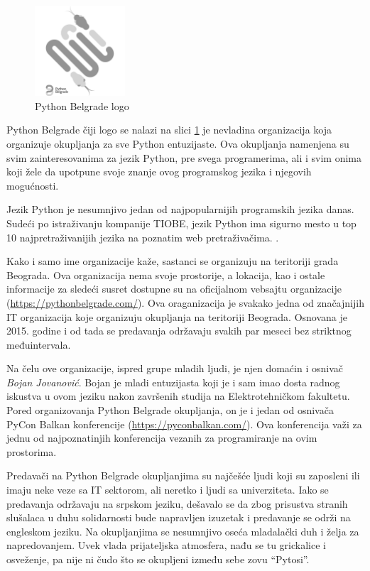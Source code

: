 \documentclass[a4paper]{article}
\begin{document}
{\begin{figure}[h!]
  \centering
  \includegraphics[width=0.3\textwidth]{pybgd.png}
  \caption{Python Belgrade logo}
  \label{fig:Pythonlogo}
\end{figure}

Python Belgrade čiji logo se nalazi na slici \ref{fig:Pythonlogo} je nevladina organizacija koja organizuje okupljanja za sve Python entuzijaste. Ova okupljanja namenjena su svim
zainteresovanima za jezik Python, pre svega programerima, ali i svim onima koji žele da upotpune svoje znanje ovog programskog jezika i njegovih mogućnosti.

Jezik Python je nesumnjivo jedan od najpopularnijih programskih jezika danas. Sudeći po istraživanju kompanije TIOBE, jezik Python ima sigurno mesto u top 10 najpretraživanijih jezika na poznatim web pretraživačima. \cite{pythonPopular}.

Kako i samo ime organizacije kaže, sastanci se organizuju na teritoriji grada Beograda. Ova organizacija nema svoje prostorije, a lokacija, kao i ostale informacije
za sledeći susret dostupne su na oficijalnom vebsajtu organizacije (\url{https://pythonbelgrade.com/}). Ova oraganizacija je svakako jedna od značajnijih IT organizacija koje organizuju okupljanja na teritoriji Beograda. Osnovana je 2015. godine i od tada se predavanja održavaju svakih par meseci bez striktnog međuintervala. 

Na čelu ove organizacije, ispred grupe mladih ljudi, je njen domaćin i osnivač \textit{Bojan Jovanović}. Bojan je mladi entuzijasta koji je i sam imao dosta radnog iskustva u ovom jeziku nakon završenih studija na
Elektrotehničkom fakultetu. Pored organizovanja Python Belgrade okupljanja, on je i jedan od osnivača PyCon Balkan konferencije (\url{https://pyconbalkan.com/}). Ova konferencija važi za jednu od najpoznatinjih konferencija vezanih za programiranje na ovim prostorima.

Predavači na Python Belgrade okupljanjima su najčešće ljudi koji su zaposleni ili imaju neke veze sa IT sektorom, ali neretko i ljudi sa univerziteta. \cite{pybgdSpeakers} Iako se predavanja održavaju na srpskom jeziku, dešavalo se da zbog prisustva stranih slušalaca u duhu solidarnosti bude napravljen izuzetak i predavanje se održi na engleskom jeziku. Na okupljanjima se nesumnjivo oseća mladalački duh i želja za napredovanjem. Uvek vlada prijateljska atmosfera, nađu se tu grickalice i osveženje, pa nije ni čudo što se okupljeni između sebe zovu ``Pytosi''.

}
\end{document}
